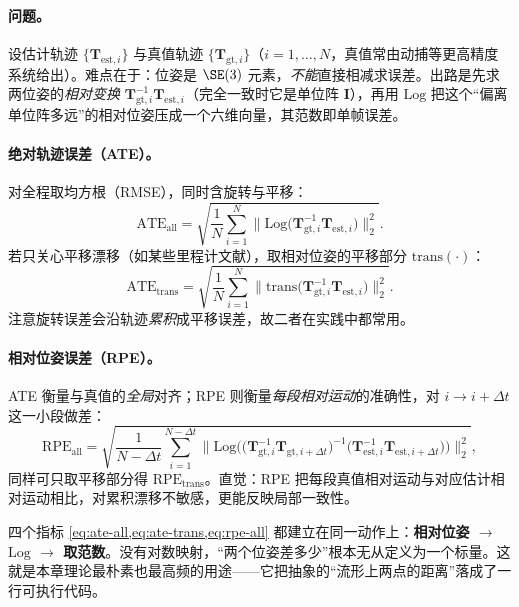 \paragraph{问题。}设估计轨迹 $\{\mathbf{T}_{\mathrm{est},i}\}$ 与真值轨迹 $\{\mathbf{T}_{\mathrm{gt},i}\}$（$i=1,\dots,N$，真值常由动捕等更高精度系统给出）。难点在于：位姿是 $\SE(3)$ 元素，\emph{不能}直接相减求误差。出路是先求两位姿的\emph{相对变换} $\mathbf{T}_{\mathrm{gt},i}^{-1}\mathbf{T}_{\mathrm{est},i}$（完全一致时它是单位阵 $\mathbf{I}$），再用 $\mathrm{Log}$ 把这个“偏离单位阵多远”的相对位姿压成一个六维向量，其范数即单帧误差。

\paragraph{绝对轨迹误差（ATE）。}对全程取均方根（RMSE），同时含旋转与平移：
\begin{equation}
  \mathrm{ATE}_{\text{all}}=\sqrt{\frac{1}{N}\sum_{i=1}^{N}\big\|\mathrm{Log}\big(\mathbf{T}_{\mathrm{gt},i}^{-1}\mathbf{T}_{\mathrm{est},i}\big)\big\|_2^2}.
  \label{eq:ate-all}
\end{equation}
若只关心平移漂移（如某些里程计文献），取相对位姿的平移部分 $\mathrm{trans}(\cdot)$：
\begin{equation}
  \mathrm{ATE}_{\text{trans}}=\sqrt{\frac{1}{N}\sum_{i=1}^{N}\big\|\mathrm{trans}\big(\mathbf{T}_{\mathrm{gt},i}^{-1}\mathbf{T}_{\mathrm{est},i}\big)\big\|_2^2}.
  \label{eq:ate-trans}
\end{equation}
注意旋转误差会沿轨迹\emph{累积}成平移误差，故二者在实践中都常用。

\paragraph{相对位姿误差（RPE）。}ATE 衡量与真值的\emph{全局}对齐；RPE 则衡量\emph{每段相对运动}的准确性，对 $i\to i+\Delta t$ 这一小段做差：
\begin{equation}
  \mathrm{RPE}_{\text{all}}=\sqrt{\frac{1}{N-\Delta t}\sum_{i=1}^{N-\Delta t}\Big\|\mathrm{Log}\Big(\big(\mathbf{T}_{\mathrm{gt},i}^{-1}\mathbf{T}_{\mathrm{gt},i+\Delta t}\big)^{-1}\big(\mathbf{T}_{\mathrm{est},i}^{-1}\mathbf{T}_{\mathrm{est},i+\Delta t}\big)\Big)\Big\|_2^2},
  \label{eq:rpe-all}
\end{equation}
同样可只取平移部分得 $\mathrm{RPE}_{\text{trans}}$。直觉：RPE 把每段真值相对运动与对应估计相对运动相比，对累积漂移不敏感，更能反映局部一致性。

\begin{insight}
四个指标 \cref{eq:ate-all,eq:ate-trans,eq:rpe-all} 都建立在同一动作上：\textbf{相对位姿 $\to$ $\mathrm{Log}$ $\to$ 取范数}。没有对数映射，“两个位姿差多少”根本无从定义为一个标量。这就是本章理论最朴素也最高频的用途——它把抽象的“流形上两点的距离”落成了一行可执行代码。
\end{insight}

